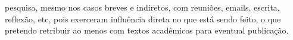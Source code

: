 \documentclass[a4paper, 11pt]{article} %
\begin{document}
pesquisa, mesmo nos casos breves e indiretos, com reuniões, emails, escrita, reflexão, etc, pois exerceram influência direta no que está sendo feito, o que pretendo retribuir ao menos com textos acadêmicos para eventual publicação.

%



\end{document}
